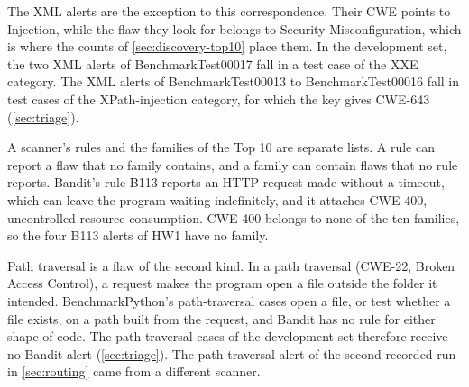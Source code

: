 The XML alerts are the exception to this correspondence. Their CWE points to Injection, while the
flaw they look for belongs to Security Misconfiguration, which is where the counts of
\cref{sec:discovery-top10} place them. In the development set, the two XML alerts of
BenchmarkTest00017 fall in a test case of the XXE category. The XML alerts of BenchmarkTest00013 to
BenchmarkTest00016 fall in test cases of the XPath-injection category, for which the key gives
CWE-643 (\cref{sec:triage}).

A scanner's rules and the families of the Top 10 are separate lists. A rule can report a flaw that
no family contains, and a family can contain flaws that no rule reports. Bandit's rule B113 reports
an HTTP request made without a timeout, which can leave the program waiting indefinitely, and it
attaches CWE-400, uncontrolled resource consumption. CWE-400 belongs to none of the ten families,
so the four B113 alerts of HW1 have no family.

Path traversal is a flaw of the second kind. In a path traversal (CWE-22, Broken Access Control), a
request makes the program open a file outside the folder it intended. BenchmarkPython's
path-traversal cases open a file, or test whether a file exists, on a path built from the request,
and Bandit has no rule for either shape of code. The
path-traversal cases of the development set therefore receive no Bandit alert (\cref{sec:triage}).
The path-traversal alert of the second recorded run in \cref{sec:routing} came from a different
scanner.

